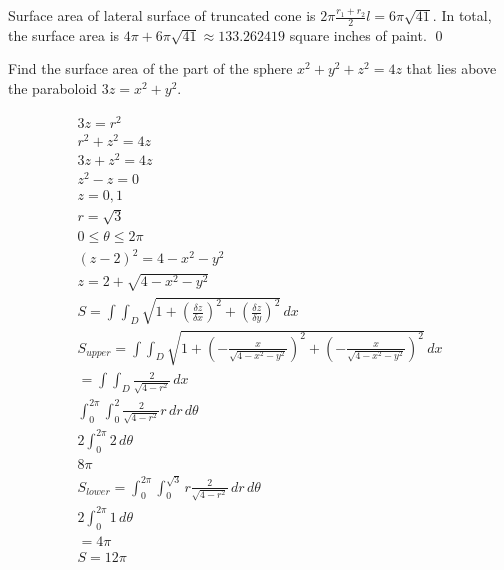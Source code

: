 \documentclass[12pt]{exam}
\begin{document}
\begin{questions}
\begin{solution}
        Surface area of lateral surface of truncated cone is $2\pi\frac{r_1 + r_2}{2} l = 6\pi \sqrt{41}$.
        In total, the surface area is $\boxed{ 4 \pi + 6\pi \sqrt{41} \approx 133.262419 }$ square inches of paint. \qed
    \end{solution}
    \clearpage
\question Find the surface area of the part of the sphere $x^2+y^2+z^2 = 4z$ that lies above the paraboloid $3z = x^2+y^2$.
    \begin{solution}
        \begin{gather*}
            3z = r^2 \\
            r^2 + z^2 = 4z \\
            3z + z^2 = 4z \\
            z^2 - z = 0 \\
            z = 0, 1 \\
            r = \sqrt{3} \\
            0 \leq \theta \leq 2\pi \\
            (z-2)^2 = 4 - x^2 - y^2 \\
            z = 2 + \sqrt{4 - x^2 - y^2} \\
            S = \int\int_D \sqrt{1 + \left(\frac{\delta z}{\delta x}\right)^2 + \left(\frac{\delta z}{\delta y}\right)^2} \, dx \\
            S_{upper}= \int\int_D \sqrt{1 + \left(-\frac{x}{\sqrt{4 - x^2 - y^2}}\right)^2 + \left(-\frac{x}{\sqrt{4 - x^2 - y^2}}\right)^2} \, dx \\
            = \int\int_D \frac{2}{\sqrt{4 - r^2}}\, dx \\
            \int_{0}^{2\pi} \int_{0}^{2} \frac{2}{\sqrt{4 - r^2}}r \, dr\, d\theta \\
            2 \int_{0}^{2\pi} 2 \, d\theta \\
            8\pi \\
            S_{lower} = \int_{0}^{2\pi}\int_{0}^{\sqrt{3}}r\frac{2}{\sqrt{4-r^2}}\, dr\, d\theta \\
            2 \int_{0}^{2\pi} 1 \, d\theta \\
            = 4\pi \\
            \boxed{S = 12\pi} \tag*{\qed}
        \end{gather*}
    \end{solution}
    \clearpage


\end{questions}
\end{document}

